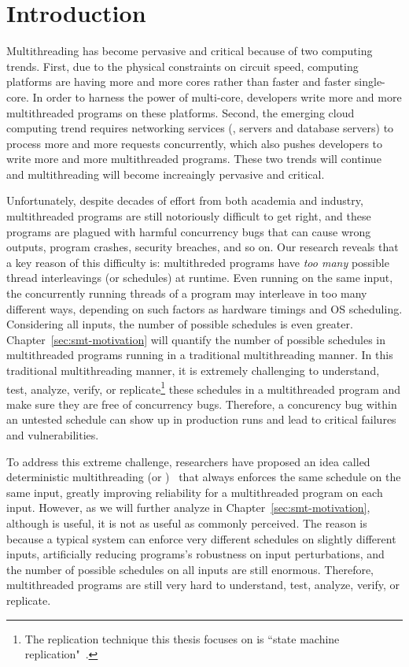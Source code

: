 \chapter{Introduction} \label{sec:intro}

Multithreading has become pervasive and critical because of two computing
trends. First, due to the physical constraints on circuit speed, computing
platforms are having more and more cores rather than faster and faster
single-core. In order to harness the power of multi-core, developers write more
and more multithreaded programs on these platforms. Second, the emerging cloud
computing trend requires networking services (\eg, \http servers and database
servers) to process more and more requests concurrently, which also pushes
developers to write more and more multithreaded programs. These two trends will
continue and multithreading will become increaingly pervasive and critical.

Unfortunately, despite decades of effort from both academia and industry,
multithreaded programs are still notoriously difficult to get right, and these
programs are plagued with harmful concurrency bugs that can cause wrong outputs,
program crashes, security breaches, and so on. Our research reveals that a key
reason of this difficulty is: multithreded programs have \emph{too many}
possible thread interleavings (or schedules) at runtime. Even running on the
same input, the concurrently running threads of a program may interleave in too
many different ways, depending on such factors as hardware timings and OS
scheduling. Considering all inputs, the number of possible schedules is even
greater. Chapter~\ref{sec:smt-motivation} will quantify the number of
possible schedules in multithreaded programs running in a traditional
multithreading manner. In this traditional multithreading manner, it is
extremely challenging to understand, test, analyze, verify, or
replicate\footnote{ The replication technique this thesis focuses on is
``state machine replication"~\cite{paxos:practical}. } these schedules in a
multithreaded program and make sure they are free of concurrency bugs.
Therefore, a concurency bug within an untested schedule can show up in
production runs and lead to critical failures and vulnerabilities.

To address this extreme challenge, researchers have proposed an idea called
deterministic multithreading (or \dmt)~\cite{dthreads:sosp11, dpj:oopsla09,
dmp:asplos09, kendo:asplos09, coredet:asplos10} that always enforces the same
schedule on the same input, greatly improving reliability for a multithreaded
program on each input. However, as we will further analyze in
Chapter~\ref{sec:smt-motivation}, although \dmt is useful, it is not as useful
as commonly perceived. The reason is because a typical \dmt system can enforce
very different schedules on slightly different inputs, artificially reducing
programs's robustness on input perturbations, and the number of possible
schedules on all inputs are still enormous. Therefore, multithreaded programs
are still very hard to understand, test, analyze, verify, or replicate.

